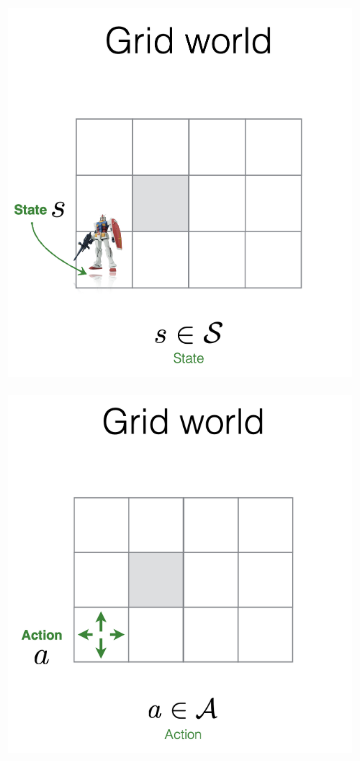 \documentclass[11pt]{article}
\begin{document}
\begin{figure}[H]
    \centering
     \begin{subfigure}{0.3\linewidth}
         \includegraphics[width=\linewidth]{images/state.png}
     \end{subfigure}%
     \begin{subfigure}{0.3\linewidth}
         \includegraphics[width=\linewidth]{images/action.png}

\end{subfigure}
\end{figure}
\end{document}
